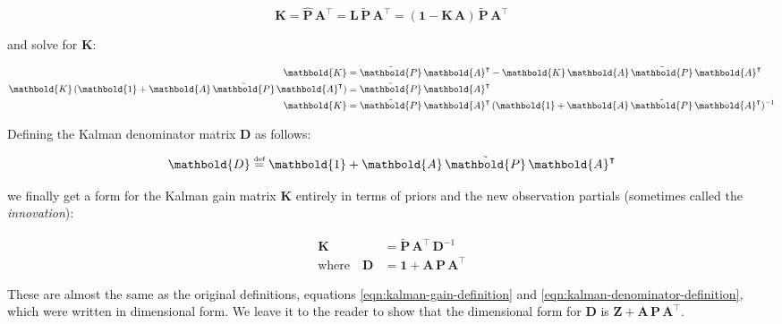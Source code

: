 \documentclass[10pt,oneside,x11names]{article}
\begin{document}
\begin{equation*}
\mathbold{K}
=
\hat{\mathbold{P}}\,
\mathbold{A}^\intercal
=
\mathbold{L}\,
\tilde{\mathbold{P}}\,
\mathbold{A}^\intercal
=
(\mathbold{1}-
\mathbold{K}\,
\mathbold{A})\,
\tilde{\mathbold{P}}\,
\mathbold{A}^\intercal
\end{equation*}

\noindent and solve for \(\mathbold{K}\):

\begin{align}
\notag
\mathbold{K}
&=
\tilde{\mathbold{P}}\,
\mathbold{A}^\intercal
-
\mathbold{K}\,
\mathbold{A}\,
\tilde{\mathbold{P}}\,
\mathbold{A}^\intercal
\\
\notag
\mathbold{K}\,
(\mathbold{1}+
\mathbold{A}\,
\tilde{\mathbold{P}}\,
\mathbold{A}^\intercal)
&=
\tilde{\mathbold{P}}\,
\mathbold{A}^\intercal
\\
\label{eqn:for-k}
\mathbold{K}
&=
\tilde{\mathbold{P}}\,
\mathbold{A}^\intercal\,
(\mathbold{1}+
\mathbold{A}\,
\tilde{\mathbold{P}}\,
\mathbold{A}^\intercal)^{-1}
\end{align}

Defining the Kalman denominator matrix \(\mathbold{D}\) as follows:

\begin{equation}
\label{eqn:definition-of-d}
\mathbold{D}
\stackrel{\text{\tiny def}}{=}
\mathbold{1}+
\mathbold{A}\,
\tilde{\mathbold{P}}\,
\mathbold{A}^\intercal
\end{equation}

\noindent we finally get a form for the Kalman gain matrix \(\mathbold{K}\)
entirely in terms of priors and the new observation partials (sometimes called
the \emph{innovation}):

\begin{align}
\label{eqn:kalman-gain-definition-2}
\mathbold{K}
&=
\tilde{\mathbold{P}}\,
\mathbold{A}^\intercal\,
\mathbold{D}^{-1} 
\\
\label{eqn:kalman-denominator-definition-2}
\text{where}\quad
\mathbold{D}
&= \mathbold{1} +
\mathbold{A}\,
\mathbold{P}\,
\mathbold{A}^\intercal
\end{align}

\noindent These are almost the same as the original definitions, equations
\ref{eqn:kalman-gain-definition} and \ref{eqn:kalman-denominator-definition},
which were written in dimensional form. We leave it to the reader to show that
the dimensional form for \(\mathbold{D}\) is
\(\mathbold{Z}+
\mathbold{A}\,
\mathbold{P}\,
\mathbold{A}^\intercal\).
\end{document}
